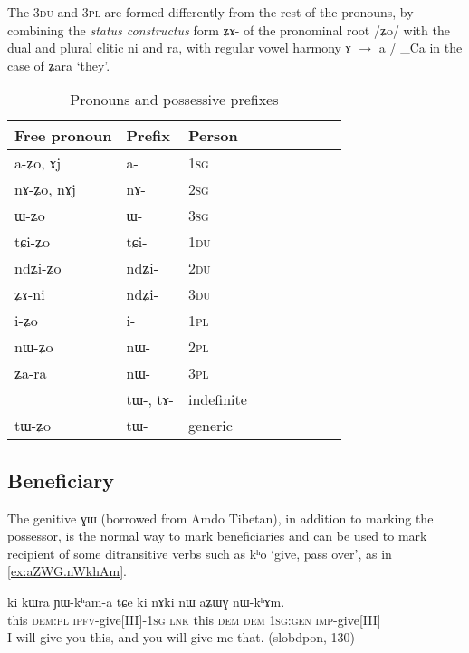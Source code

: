 \documentclass[oldfontcommands,oneside,a4paper,11pt]{article}
\newcommand{\ipa}[1]{\mbox{\phon #1}} %
\begin{document}
The \textsc{3du} and \textsc{3pl} are formed differently from the rest of the pronouns, by combining the \textit{status constructus} form \ipa{ʑɤ-} of the pronominal root /\ipa{ʑo}/ with the dual and plural clitic \ipa{ni} and \ipa{ra}, with regular vowel harmony \ipa{ɤ} $\rightarrow$ \ipa{a} / \_Ca in the case of \ipa{ʑara} `they'.
 
 \begin{table}[H] \centering
\caption{Pronouns and possessive prefixes }\label{tab:pronoun}
\begin{tabular}{lllllllll} 
\toprule
 Free pronoun & Prefix & Person\\
\midrule
 \ipa{a-ʑo},    \ipa{ɤj} &	\ipa{a-}  &		1\textsc{sg} \\
\ipa{nɤ-ʑo},  \ipa{nɤj} &	\ipa{nɤ-}  &			2\textsc{sg}\\
\ipa{ɯ-ʑo}  &	\ipa{ɯ-}  &			3\textsc{sg}\\
\midrule
\ipa{tɕi-ʑo}  &	\ipa{tɕi-}  &			1\textsc{du} \\
\ipa{ndʑi-ʑo}  &	\ipa{ndʑi-}  &		2\textsc{du} \\	
\ipa{ʑɤ-ni}  &	\ipa{ndʑi-}  &		3\textsc{du} \\	
\midrule
\ipa{i-ʑo}    &	\ipa{i-}  &			1\textsc{pl} \\
\ipa{nɯ-ʑo}   &	\ipa{nɯ-}  &			2\textsc{pl} \\
\ipa{ʑa-ra}  &	\ipa{nɯ-}  &			3\textsc{pl} \\
\midrule
&  \ipa{tɯ-},  \ipa{tɤ-} & indefinite \\
\ipa{tɯ-ʑo} & \ipa{tɯ-}   &  generic\\
\bottomrule
\end{tabular}
\end{table}
 
 

 
 \subsection{Beneficiary}  \label{sec:benef}
The genitive \ipa{ɣɯ} (borrowed from Amdo Tibetan), in addition to marking the possessor, is the normal way to mark beneficiaries and can be used to mark recipient of some ditransitive verbs such as \ipa{kʰo} `give, pass over', as in \ref{ex:aZWG.nWkhAm}.

\begin{exe}
\ex \label{ex:aZWG.nWkhAm}
\gll
\ipa{ki} 	\ipa{kɯra} 	\ipa{ɲɯ-kʰam-a} 	\ipa{tɕe} 	\ipa{ki} 	\ipa{nɤki} 	\ipa{nɯ} 	\ipa{aʑɯɣ} 	\ipa{nɯ-kʰɤm.} \\
this \textsc{dem:pl} \textsc{ipfv}-give[III]-\textsc{1sg} \textsc{lnk} this \textsc{dem} \textsc{dem} \textsc{1sg:gen} \textsc{imp}-give[III] \\
\glt I will give you this, and you will give me that. (slobdpon, 130)
\end{exe}
\end{document}
